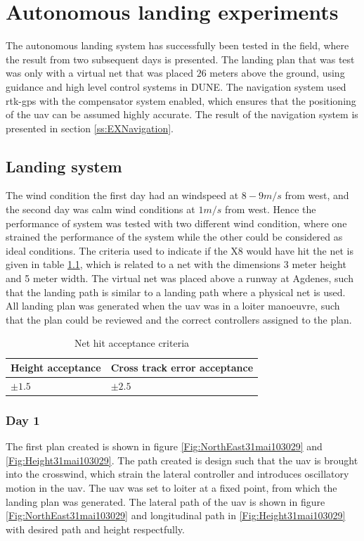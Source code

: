 \chapter{Autonomous landing experiments}
The autonomous landing system has successfully been tested in the field, where the result from two subsequent days is presented. The landing plan that was test was only with a virtual net that was placed $26$ meters above the ground, using guidance and high level control systems in DUNE. The navigation system used \gls{rtk-gps} with the compensator system enabled, which ensures that the positioning of the \gls{uav} can be assumed highly accurate. The result of the navigation system is presented in section \ref{ss:EXNavigation}.
\section{Landing system}
The wind condition the first day had an windspeed at $8-9 m/s$ from west, and the second day was calm wind conditions at $1 m/s$ from west. Hence the performance of system was tested with two different wind condition, where one strained the performance of the system while the other could be considered as ideal conditions. The criteria used to indicate if the X8 would have hit the net is given in table \ref{tb:NetCriteria}, which is related to a net with the dimensions 3 meter height and 5 meter width. The virtual net was placed above a runway at Agdenes, such that the landing path is similar to a landing path where a physical net is used. All landing plan was generated when the \gls{uav} was in a loiter manoeuvre, such that the plan could be reviewed and the correct controllers assigned to the plan.
\begin{table}[H]
\centering
\begin{tabular}{| l | l |}
\hline
\textbf{Height acceptance}	& \textbf{Cross track error acceptance}	\\ \hline
$\pm1.5$					& $\pm2.5$								\\ \hline
\end{tabular}
\caption{Net hit acceptance criteria}
\label{tb:NetCriteria}
\end{table} 
\newpage
\subsection{Day 1}
The first plan created is shown in figure \ref{Fig:NorthEast31mai103029} and \ref{Fig:Height31mai103029}. The path created is design such that the \gls{uav} is brought into the crosswind, which strain the lateral controller and introduces oscillatory motion in the \gls{uav}.
 The \gls{uav} was set to loiter at a fixed point, from which the landing plan was generated. The lateral path of the \gls{uav} is shown in figure \ref{Fig:NorthEast31mai103029} and longitudinal path in \ref{Fig:Height31mai103029} with desired path and height respectfully.


